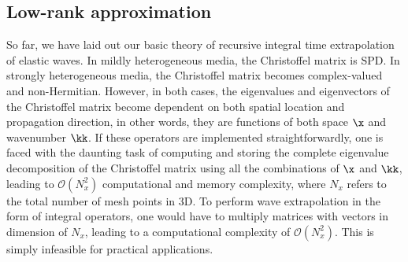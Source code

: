 \subsection{Low-rank approximation}
So far, we have laid out our basic theory of recursive integral time extrapolation of elastic waves. In mildly heterogeneous media, the Christoffel matrix is SPD. In strongly heterogeneous media, the Christoffel matrix becomes complex-valued and non-Hermitian. However, in both cases, the eigenvalues and eigenvectors of the Christoffel matrix become dependent on both spatial location and propagation direction, in other words, they are functions of both space $\x$ and wavenumber $\kk$. If these operators are implemented straightforwardly, one is faced with the daunting task of computing and storing the complete eigenvalue decomposition of the Christoffel matrix using all the combinations of $\x$ and $\kk$, leading to $\mathcal{O}(N_x^2)$ computational and memory complexity, where $N_x$ refers to the total number of mesh points in $3$D. To perform wave extrapolation in the form of integral operators, one would have to multiply matrices with vectors in dimension of $N_x$, leading to a computational complexity of $\mathcal{O}(N_x^2)$. This is simply infeasible for practical applications.

